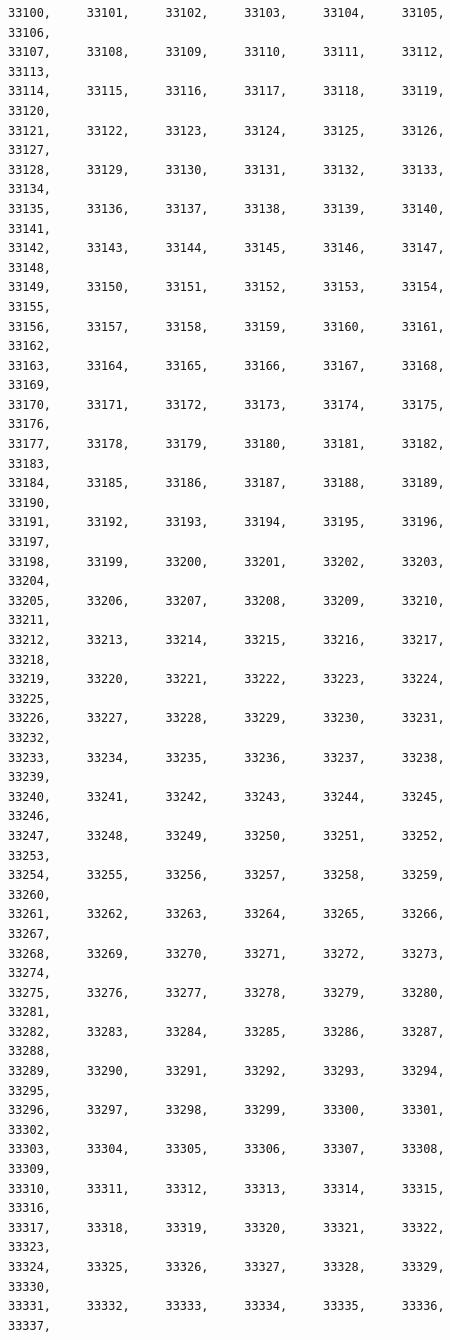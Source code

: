 \documentclass[a4paper,11pt]{report}
\begin{document}
\begin{verbatim}
33100,     33101,     33102,     33103,     33104,     33105,     33106,     
33107,     33108,     33109,     33110,     33111,     33112,     33113,     
33114,     33115,     33116,     33117,     33118,     33119,     33120,     
33121,     33122,     33123,     33124,     33125,     33126,     33127,     
33128,     33129,     33130,     33131,     33132,     33133,     33134,     
33135,     33136,     33137,     33138,     33139,     33140,     33141,     
33142,     33143,     33144,     33145,     33146,     33147,     33148,     
33149,     33150,     33151,     33152,     33153,     33154,     33155,     
33156,     33157,     33158,     33159,     33160,     33161,     33162,     
33163,     33164,     33165,     33166,     33167,     33168,     33169,     
33170,     33171,     33172,     33173,     33174,     33175,     33176,     
33177,     33178,     33179,     33180,     33181,     33182,     33183,     
33184,     33185,     33186,     33187,     33188,     33189,     33190,     
33191,     33192,     33193,     33194,     33195,     33196,     33197,     
33198,     33199,     33200,     33201,     33202,     33203,     33204,     
33205,     33206,     33207,     33208,     33209,     33210,     33211,     
33212,     33213,     33214,     33215,     33216,     33217,     33218,     
33219,     33220,     33221,     33222,     33223,     33224,     33225,     
33226,     33227,     33228,     33229,     33230,     33231,     33232,     
33233,     33234,     33235,     33236,     33237,     33238,     33239,     
33240,     33241,     33242,     33243,     33244,     33245,     33246,     
33247,     33248,     33249,     33250,     33251,     33252,     33253,     
33254,     33255,     33256,     33257,     33258,     33259,     33260,     
33261,     33262,     33263,     33264,     33265,     33266,     33267,     
33268,     33269,     33270,     33271,     33272,     33273,     33274,     
33275,     33276,     33277,     33278,     33279,     33280,     33281,     
33282,     33283,     33284,     33285,     33286,     33287,     33288,     
33289,     33290,     33291,     33292,     33293,     33294,     33295,     
33296,     33297,     33298,     33299,     33300,     33301,     33302,     
33303,     33304,     33305,     33306,     33307,     33308,     33309,     
33310,     33311,     33312,     33313,     33314,     33315,     33316,     
33317,     33318,     33319,     33320,     33321,     33322,     33323,     
33324,     33325,     33326,     33327,     33328,     33329,     33330,     
33331,     33332,     33333,     33334,     33335,     33336,     33337,     

\end{verbatim}
\end{document}
